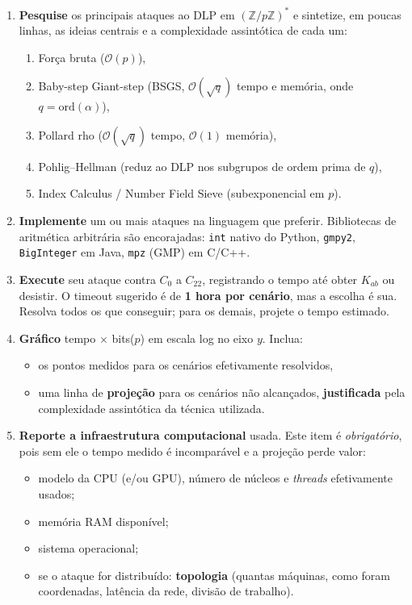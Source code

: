 \documentclass[12pt,a4paper]{article}
\begin{document}
\begin{enumerate}
  \item \textbf{Pesquise} os principais ataques ao DLP em $(\mathbb{Z}/p\mathbb{Z})^*$ e sintetize, em poucas linhas, as ideias centrais e a complexidade assintótica de cada um:
  \begin{enumerate}[label=\alph*), nosep]
    \item Força bruta ($\mathcal{O}(p)$),
    \item Baby-step Giant-step (BSGS, $\mathcal{O}(\sqrt{q})$ tempo e memória, onde $q = \mathrm{ord}(\alpha)$),
    \item Pollard rho ($\mathcal{O}(\sqrt{q})$ tempo, $\mathcal{O}(1)$ memória),
    \item Pohlig--Hellman (reduz ao DLP nos subgrupos de ordem prima de $q$),
    \item Index Calculus / Number Field Sieve (subexponencial em $p$).
  \end{enumerate}

  \item \textbf{Implemente} um ou mais ataques na linguagem que preferir. Bibliotecas de aritmética arbitrária são encorajadas: \texttt{int} nativo do Python, \texttt{gmpy2}, \texttt{BigInteger} em Java, \texttt{mpz} (GMP) em C/C++.

  \item \textbf{Execute} seu ataque contra $C_0$ a $C_{22}$, registrando o tempo até obter $K_{ab}$ ou desistir. O timeout sugerido é de \textbf{1 hora por cenário}, mas a escolha é sua. Resolva todos os que conseguir; para os demais, projete o tempo estimado.

  \item \textbf{Gráfico} tempo $\times$ bits($p$) em escala log no eixo $y$. Inclua:
  \begin{itemize}[nosep]
    \item os pontos medidos para os cenários efetivamente resolvidos,
    \item uma linha de \textbf{projeção} para os cenários não alcançados, \textbf{justificada} pela complexidade assintótica da técnica utilizada.
  \end{itemize}

  \item \textbf{Reporte a infraestrutura computacional} usada. Este item é \emph{obrigatório}, pois sem ele o tempo medido é incomparável e a projeção perde valor:
  \begin{itemize}[nosep]
    \item modelo da CPU (e/ou GPU), número de núcleos e \textit{threads} efetivamente usados;
    \item memória RAM disponível;
    \item sistema operacional;
    \item se o ataque for distribuído: \textbf{topologia} (quantas máquinas, como foram coordenadas, latência da rede, divisão de trabalho).
  \end{itemize}


\end{enumerate}
\end{document}
